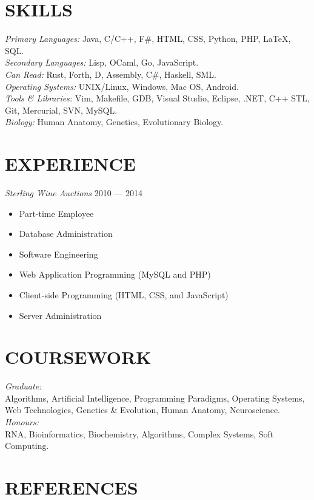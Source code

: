 \documentclass[margin, 10pt]{res} %
\begin{document}
\begin{resume}
\section{SKILLS} 

{\sl Primary Languages:} 
Java, C/C++, F\#, HTML, CSS, Python, PHP, \LaTeX, SQL. \\
{\sl Secondary Languages:} 
Lisp, OCaml, Go, JavaScript. \\
{\sl Can Read:} 
Rust, Forth, D, Assembly, C\#, Haskell, SML. \\
{\sl Operating Systems:} UNIX/Linux, Windows, Mac OS, Android. \\
{\sl Tools \& Libraries:} Vim, Makefile, GDB, Visual Studio, Eclipse, .NET, C++ STL, Git, Mercurial, SVN, MySQL. \\
{\sl Biology:} Human Anatomy, Genetics, Evolutionary Biology.
 

\section{EXPERIENCE}

{\sl Sterling Wine Auctions} \hfill 2010 --- 2014 \\
\begin{itemize}
\item Part-time Employee
\item Database Administration
\item Software Engineering
\item Web Application Programming (MySQL and PHP)
\item Client-side Programming (HTML, CSS, and JavaScript)
\item Server Administration
\end{itemize}

\section{COURSEWORK}

{\sl Graduate: }\\
Algorithms, 
Artificial Intelligence, 
Programming Paradigms, 
Operating Systems, 
Web Technologies, 
Genetics \& Evolution, 
Human Anatomy, 
Neuroscience. \\

{\sl Honours: } \\
RNA, 
Bioinformatics, 
Biochemistry, 
Algorithms, 
Complex Systems, 
Soft Computing.

\section{REFERENCES}


\end{resume}
\end{document}
